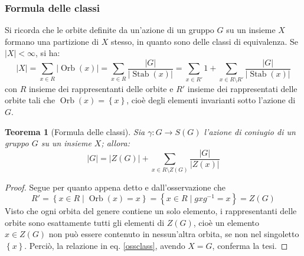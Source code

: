 \documentclass[11pt]{article}
\theoremstyle{style}
\newtheorem{teorema}{Teorema}[section]
\numberwithin{equation}{subsection}
\begin{document}
\subsubsection{Formula delle classi}

Si ricorda che le orbite definite da un'azione di un gruppo $G$ su un insieme $X$ formano una partizione di $X$ stesso, in quanto sono delle classi di equivalenza.
Se $\lvert X \rvert < \infty$, si ha:
\begin{equation}\label{ossclass}
\lvert X \rvert  = \sum_{x \in R}^{} \lvert \operatorname{Orb} (x) \rvert = \sum_{x \in R}^{} \frac{\lvert G \rvert }{\lvert \operatorname{Stab} (x) \rvert } = \sum_{x \in R'}^{} 1 + \sum_{x \in R \setminus R '}^{} \frac{\lvert G \rvert }{\lvert \operatorname{Stab} (x) \rvert }
\end{equation}
con $R$ insieme dei rappresentanti delle orbite e $R'$ insieme dei rappresentati delle orbite tali che $\operatorname{Orb} (x) = \left\{ x \right\} $, cio\`e degli elementi invarianti sotto l'azione di $G$. 
\begin{teorema}
	[Formula delle classi]
	Sia $\gamma:G \to S(G)$ l'azione di coniugio di un gruppo $G$ su un insieme $X$; allora:
	\begin{equation*}
		\lvert G \rvert  = |Z(G)| + \sum_{x \in R \setminus Z(G)}^{} \frac{\lvert G \rvert }{\lvert Z(x) \rvert }
	\end{equation*}
\end{teorema}
	\begin{proof}
		Segue per quanto appena detto e dall'osservazione che
		\[
		R' = \left\{ x \in R  \mid \operatorname{Orb} (x) = x \right\} = \left\{ x \in R  \mid gxg^{-1} = x \right\} = Z(G)
		\] 
		Visto che ogni orbita del genere contiene un solo elemento, i rappresentanti delle orbite sono esattamente tutti gli elementi di $Z(G)$, cio\`e un elemento $x \in Z(G)$ non pu\`o essere contenuto in nessun'altra orbita, se non nel singoletto $\left\{ x \right\} $.
		Perci\`o, la relazione in eq. \ref{ossclass}, avendo $X=G$, conferma la tesi.
	\end{proof}
\end{document}

